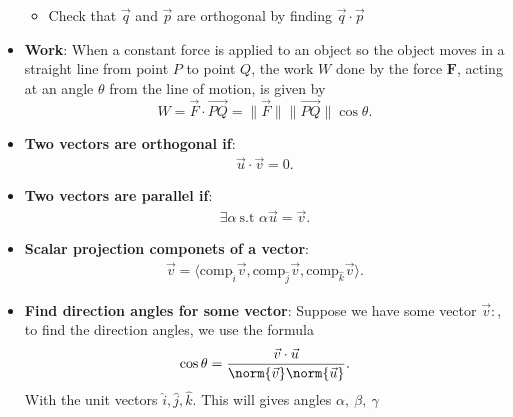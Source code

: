 \documentclass{report}
\begin{document}
\begin{itemize}
\begin{itemize}
                    \item Check that $\vec{q}$ and $\vec{p}$ are orthogonal by finding $\vec{q} \cdot \vec{p}$
                \end{itemize}
            \item \textbf{Work}:
                When a constant force is applied to an object so the object moves in a straight line from point $P$ to point $Q$, the work $W$ done by the force $\mathbf{F}$, acting at an angle $\theta$ from the line of motion, is given by
                \[ W = \vec{F} \cdot \overrightarrow{PQ} = \|\vec{F}\| \|\overrightarrow{PQ}\| \cos \theta. \]
            \item \textbf{Two vectors are orthogonal if}:
                \begin{align*}
                    \vec{u} \cdot \vec{v} = 0
                .\end{align*}
            \item \textbf{Two vectors are parallel if}:
                \begin{align*}
                    \exists \alpha\ \text{s.t } \alpha\vec{u} = \vec{v}
                .\end{align*}
            \item \textbf{Scalar projection componets of a vector}:
                \begin{align*}
                    \vec{v} = \langle \text{comp}_{\hat{i}}\vec{v}, \text{comp}_{\hat{j}}\vec{v}, \text{comp}_{\hat{k}}\vec{v}\rangle
                .\end{align*}
            \item \textbf{Find direction angles for some vector}: Suppose we have some vector $\vec{v}:$, to find the direction angles, we use the formula
                \begin{align*}
                    \cos{\theta} = \frac{\vec{v} \cdot \vec{u}}{\norm{\vec{v}} \norm{\vec{u}}}
                .\end{align*}
                With the unit vectors $\hat{i}, \hat{j}, \hat{k}$. This will gives angles $\alpha,\ \beta,\ \gamma $


\end{itemize}
\end{document}
